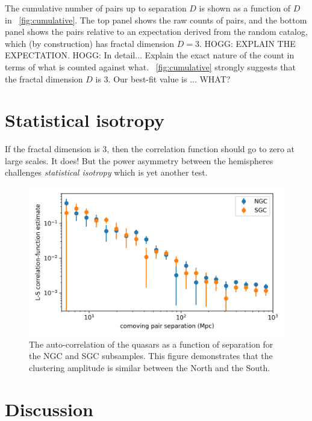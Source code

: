 \documentclass[modern]{aastex631}
\newlength{\figurewidth}
\newcommand{\figref}[1]{\figurename~\ref{#1}}
\begin{document}
The cumulative number of pairs up to separation $D$ is shown as a function of $D$ in \figref{fig:cumulative}.
The top panel shows the raw counts of pairs, and the bottom panel shows the pairs relative to an expectation derived from the random catalog, which (by construction) has fractal dimension $D=3$.
HOGG: EXPLAIN THE EXPECTATION.
HOGG: In detail... Explain the exact nature of the count in terms of what is counted against what.
\figref{fig:cumulative} strongly suggests that the fractal dimension $D$ is 3.
Our best-fit value is ... WHAT?

\section{Statistical isotropy}

If the fractal dimension is 3, then the correlation function should go to zero at large scales.
It does!
But the power asymmetry between the hemispheres challenges \emph{statistical isotropy} which is yet another test.

\begin{figure}[t!]
  \begin{mdframed}
  \color{captiongray}
  \begin{center}
    \includegraphics[width=\figurewidth]{notebooks/corrfunc.png}
  \end{center}
    \caption{The auto-correlation of the quasars as a function of separation for the NGC and SGC subsamples.
    This figure demonstrates that the clustering amplitude is similar between the North and the South.\label{fig:corrfunc}}
  \end{mdframed}
\end{figure}

\section{Discussion}
\end{document}
